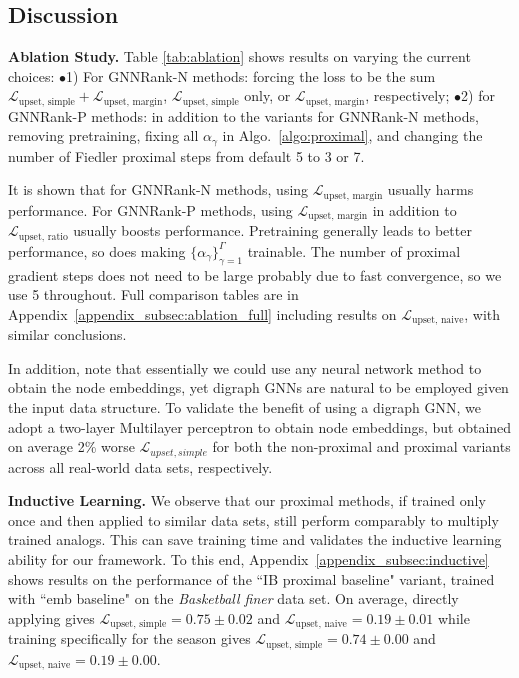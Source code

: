 \documentclass[nohyperref]{article}
\theoremstyle{plain}
\theoremstyle{definition}
\theoremstyle{remark}
\newcommand{\bb}{\hspace{-1mm} $\bullet$}
\begin{document}
\subsection{Discussion}
\textbf{Ablation Study.}
Table \ref{tab:ablation} shows results on varying the current choices:
\bb 1) For GNNRank-N methods: forcing the loss to be the sum $\mathcal{L}_\text{upset, simple}+\mathcal{L}_\text{upset, margin}$, $\mathcal{L}_\text{upset, simple}$ only, or $\mathcal{L}_\text{upset, margin}$, respectively; 
\bb 2) for GNNRank-P methods: in addition to the variants for GNNRank-N methods, removing pretraining, fixing all $\alpha_\gamma$ in Algo.~\ref{algo:proximal}, and changing the number of Fiedler proximal steps from default 5 to 3 or 7. 

It is shown that for GNNRank-N methods, using $\mathcal{L}_\text{upset, margin}$  usually harms performance.  For GNNRank-P methods, using $\mathcal{L}_\text{upset, margin}$ in addition to $\mathcal{L}_\text{upset, ratio}$ usually boosts performance.
 Pretraining generally leads to better performance, so does making $\{\alpha_\gamma\}_{\gamma=1}^\Gamma$ trainable. 
The number of proximal gradient steps does not need to be large probably due to fast convergence, so we use 5 throughout. Full comparison tables are in Appendix~\ref{appendix_subsec:ablation_full} including results on $\mathcal{L}_\text{upset, naive}$, with similar conclusions.

In addition, note that essentially we could use any neural network method to obtain the node embeddings, yet digraph GNNs are natural to be employed given the input data structure. To validate the benefit of using a digraph GNN, we adopt a two-layer Multilayer perceptron to obtain node embeddings, but obtained on average 2\% worse $\mathcal{L}_{upset, simple}$ for both the non-proximal and proximal variants across all real-world data sets, respectively.

\textbf{Inductive Learning.} 
We observe that
our proximal methods, if trained only once and then applied to similar data sets, still perform comparably to multiply trained analogs. This can save training time and validates the inductive learning ability for our framework. 
To this end, Appendix~\ref{appendix_subsec:inductive} shows results on the performance of the ``IB proximal baseline" variant, trained with ``emb baseline" on the \textit{Basketball finer} data set. On average, directly applying gives $\mathcal{L}_\text{upset, simple}=0.75\pm 0.02$ and $\mathcal{L}_\text{upset, naive}=0.19\pm 0.01$ while training specifically for the 
season gives $\mathcal{L}_\text{upset, simple}=0.74\pm 0.00$ and $\mathcal{L}_\text{upset, naive}=0.19\pm 0.00$.
\end{document}
